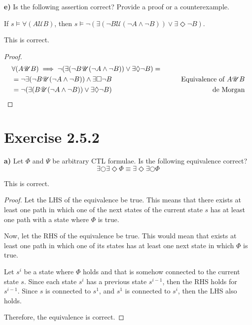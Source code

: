 \documentclass[titlepage, letterpaper, fleqn]{article}
\newcommand{\spacepls}{\vspace{5mm}}
\newcommand{\until}{\mathscr{U}}
\begin{document}
{\large \textbf{e)} Is the following assertion correct? Provide a proof or a counterexample.

If \(s \models \forall (A \until B)\), then \(s \models \neg (\exists (\neg B \until(\neg A \wedge \neg B)) \vee \exists \Diamond \neg B)\).}

\spacepls

This is correct.

\begin{proof}
\begin{align*}
& \forall (A \until B) \implies \neg (\exists (\neg B \until(\neg A \wedge \neg B)) \vee \exists \Diamond \neg B) =
\\ & = \neg \exists (\neg B \until(\neg A \wedge \neg B)) \wedge \exists \Box \neg B & \tag*{Equivalence of $A \until B$}
\\ & = \neg (\exists (B \until(\neg A \wedge \neg B)) \vee \exists \Diamond \neg B) & \tag*{de Morgan}
\end{align*}
\end{proof}

\section{Exercise 2.5.2}

{\large \textbf{a)} Let \(\Phi\) and \(\Psi\) be arbitrary CTL formulae. Is the following equivalence correct?
\[\exists \bigcirc \exists \Diamond \Phi \equiv \exists \Diamond \exists \bigcirc \Phi\]}

This is correct.

\begin{proof}
Let the LHS of the equivalence be true.
This means that there exists at least one path in which one of the next states of the current state \(s\) has at least one path with a state where \(\Phi\) is true.

Now, let the RHS of the equivalence be true.
This would mean that exists at least one path in which one of its states has at least one next state in which \(\Phi\) is true.

Let \(s^i\) be a state where \(\Phi\) holds and that is somehow connected to the current state \(s\).
Since each state \(s^i\) has a previous state \(s^{i-1}\), then the RHS holds for \(s^{i-1}\). Since \(s\) is connected to \(s^1\), and \(s^1\) is connected to \(s^i\), then the LHS also holds.

Therefore, the equivalence is correct.
\end{proof}
\end{document}
